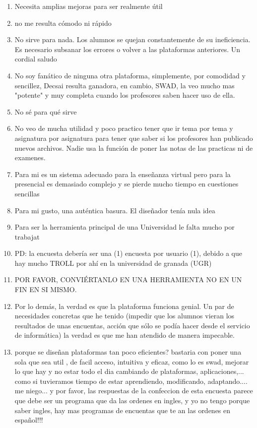 \begin{enumerate}
\item Necesita amplias mejoras para ser realmente útil
\item no me resulta cómodo ni rápido
\item No sirve para nada. Los alumnos se quejan constantemente de su ineficiencia. Es necesario subsanar los errores o volver a las plataformas anteriores. Un cordial saludo
\item No soy fanático de ninguna otra plataforma, simplemente, por comodidad y sencillez, Decsai resulta ganadora, en cambio, SWAD, la veo mucho mas "potente" y muy completa cuando los profesores saben hacer uso de ella. 
\item No sé para qué sirve
\item No veo de mucha utilidad y poco practico tener que ir tema por tema y asignatura por asignatura para tener que saber si los profesores han publicado nuevos archivos. Nadie usa la función de poner las notas de las practicas ni de examenes.
\item Para mi es un sistema adecuado para la enseñanza virtual pero para la presencial es demasiado complejo y se pierde mucho tiempo en cuestiones sencillas
\item Para mi gusto, una auténtica basura. El diseñador tenía nula idea
\item Para ser la herramienta principal de una Universidad le falta mucho por trabajat
\item PD: la encuesta debería ser una (1) encuesta por usuario (1), debido a que hay mucho TROLL por ahí en la universidad de granada (UGR)
\item POR FAVOR, CONVIÉRTANLO EN UNA HERRAMIENTA NO EN UN FIN EN SI MISMO.
\item Por lo demás, la verdad es que la plataforma funciona genial. Un par de necesidades concretas que he tenido (impedir que los alumnos vieran los resultados de unas encuentas, acción que sólo se podía hacer desde el servicio de informática) la verdad es que me han atendido de manera impecable.
\item porque se diseñan plataformas tan poco eficientes? bastaria con poner una sola que sea util , de facil acceso, intuitiva y eficaz, como lo es swad, mejorar lo que hay y no estar todo el dia cambiando de plataformas, aplicaciones,... como si tuvieramos tiempo de estar aprendiendo, modificando, adaptando.... me niego... y por favor, las respuestas de la confeccion de esta encuesta parece que debe ser un programa que da las ordenes en ingles, y yo no tengo porque saber ingles, hay mas programas de encuentas que te an las ordenes en español!!!

\end{enumerate}
